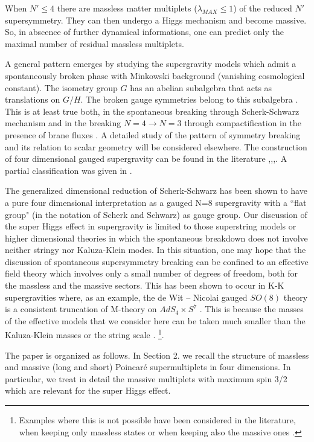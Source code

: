 \documentclass[a4paper,12pt]{article}
\begin{document}
When $N'\leq 4$ there are  massless matter multiplets ($\lambda_{MAX}\leq 1$) of the reduced $N'$ supersymmetry.
 They  can then undergo a Higgs mechanism and become massive. So, in abscence of further dynamical informations,
  one can predict only the maximal number of residual massless multiplets.

A general pattern emerges by studying the supergravity models which admit a spontaneously broken phase with
 Minkowski background (vanishing cosmological constant). The  isometry  group $G$ has an abelian subalgebra
  that acts as translations on $G/H$. The broken  gauge symmetries  belong to this subalgebra \cite{cgp,fgp,tz}.
   This is at least true both, in the spontaneous breaking through Scherk-Schwarz \cite{ss,css} mechanism and in
    the breaking $N=4\rightarrow N=3$
 \cite{fp,kst} through compactification in the presence of  brane fluxes \cite{ps,tv,ma,cklt,gkp}. A detailed
 study of the pattern of symmetry breaking and its relation to scalar geometry will be considered elsewhere.
The construction of four dimensional gauged supergravity can be
found in the literature \cite{hw1},\cite{dwn},\cite{hu},\cite{hw}. A
partial classification  was given in \cite{cfgtt}.

The generalized dimensional reduction of  Scherk-Schwarz  has been
shown to have a pure four dimensional interpretation as a gauged
N=8 supergravity \cite{adfl} with a ``flat group" (in the notation
of Scherk and Schwarz) as gauge group. Our discussion of the super
Higgs effect in supergravity  is limited to those
 superstring models or higher dimensional theories in which the spontaneous breakdown does not involve neither
 stringy nor Kaluza-Klein modes. In this situation,  one may hope that the discussion of spontaneous
  supersymmetry breaking can be
 confined to an effective field theory which involves only a small number of degrees of freedom,
  both for the massless and the massive sectors. 
This has been shown to occur in K-K supergravities where, as an example, the de Wit -- Nicolai gauged $SO(8)$ theory
is a consistent truncation of M-theory on $AdS_4 \times S^7$ \cite{dwn2}.
This is because the masses of the effective models
  that we consider here
  can be taken much smaller than the Kaluza-Klein masses or the string scale \cite{fp}.  \footnote{Examples
 where this is not possible have been considered in the literature, when keeping only  massless states \cite{dlp,bkl}
 or when keeping also
  the massive ones \cite{kk}.}.

The paper is organized as follows. In Section 2. we recall  the structure of massless and massive
(long and short) Poincar\'e  supermultiplets in four dimensions. In particular, we treat in detail
the massive multiplets with maximum spin 3/2 which are relevant for the super Higgs effect.
\end{document}
